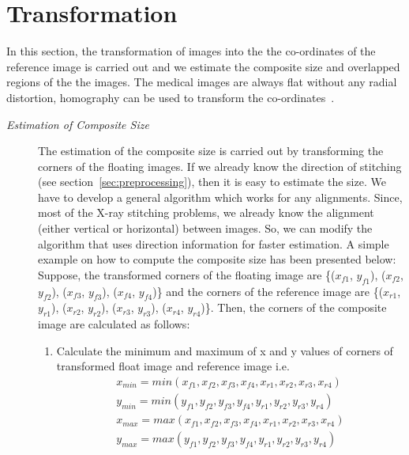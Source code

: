 \section{Transformation}
\label{sec:transformation}
In this section, the transformation of images into the the co-ordinates of the reference image is carried out and we estimate the composite size and overlapped regions of the the images. The medical images are always flat without any radial distortion, homography can be used to transform the co-ordinates~\cite{Szeliski:06}.
\begin{description}
\item [\emph{Estimation of Composite Size}]
The estimation of the composite size is carried out by transforming the corners of the floating images. If we already know the direction of stitching (see section~\ref{sec:preprocessing}), then it is easy to estimate the size. We have to develop a general algorithm which works for any alignments. Since, most of the X-ray stitching problems, we already know the alignment (either vertical or horizontal) between images. So, we can modify the algorithm that uses direction information for faster estimation. A simple example on how to compute the composite size has been presented below:\\

\noindent Suppose, the transformed corners of the floating image are \{($x_{f1}$, $y_{f1}$), ($x_{f2}$, $y_{f2}$), ($x_{f3}$, $y_{f3}$), ($x_{f4}$, $y_{f4}$)\} and the corners of the reference image are \{($x_{r1}$, $y_{r1}$), ($x_{r2}$, $y_{r2}$), ($x_{r3}$, $y_{r3}$), ($x_{r4}$, $y_{r4}$)\}. Then, the corners of the composite image are calculated as follows:
\begin{enumerate}
	\item Calculate the minimum and maximum of x and y values of corners of transformed float image and reference image i.e.
	\begin{equation}
	\begin{split}
	x_{min}=min(x_{f1},x_{f2},x_{f3},x_{f4},x_{r1},x_{r2},x_{r3},x_{r4})\\
	y_{min}=min(y_{f1},y_{f2},y_{f3},y_{f4},y_{r1},y_{r2},y_{r3},y_{r4})\\
	x_{max}=max(x_{f1},x_{f2},x_{f3},x_{f4},x_{r1},x_{r2},x_{r3},x_{r4})\\
	y_{max}=max(y_{f1},y_{f2},y_{f3},y_{f4},y_{r1},y_{r2},y_{r3},y_{r4})	
	\end{split}
	\label{eq:minmax-composite-corners}
	\end{equation}


\end{enumerate}
\end{description}
